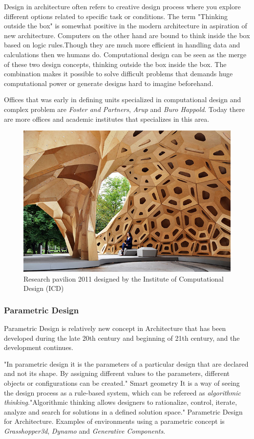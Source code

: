 Design in architecture often refers to creative design process where you explore different options related to specific task or conditions. The term "Thinking outside the box" is somewhat positive in the modern architecture in aspiration of new architecture. Computers on the other hand are bound to think inside the box based on logic rules.Though they are much more efficient in handling data and calculations then we humans do. Computational design can be seen as the merge of these two design concepts, thinking outside the box inside the box. The combination makes it possible to solve difficult problems that demands huge computational power or generate designs hard to imagine beforehand. 

Offices  that was early in defining units specialized in computational design and complex problem are \textit{Foster and Partners},\textit{ Arup} and \textit{Buro Happold}. Today there are more offices and academic institutes that specializes in this area.

\begin{figure}[H]
\centering
\includegraphics[width=0.9\linewidth ]{figure/Introduction/ICD.jpg}
\caption{Research pavilion 2011 designed by the Institute of Computational Design (ICD) }
\end{figure}

\subsubsection{Parametric Design}
Parametric Design is relatively new concept in Architecture that has been developed during the late 20th century and beginning of 21th century, and the development continues. 

"In parametric design it is the parameters of a particular design that are declared and not its shape. By assigning different values to the parameters, different objects or configurations can be created." Smart geometry
It is a way of seeing the design process as a rule-based system, which can be refereed as \textit{algorithmic thinking}."Algorithmic thinking allows designers  to rationalize, control, iterate, analyze and search for solutions in a defined solution space." Parametric Design for Architecture.
Examples of environments using a parametric concept is \textit{Grasshopper3d}, \textit{Dynamo} and 
\textit{Generative Components}.

